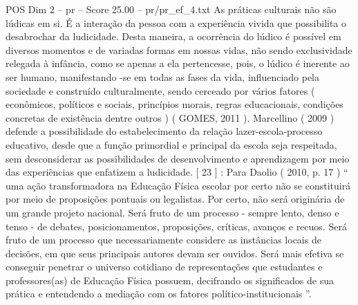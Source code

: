 \begin{textsample}{POS Dim 2 – pr – Score 25.00 – pr/pr\_ef\_4.txt}
As práticas culturais não são lúdicas em si.
É a interação da pessoa com a experiência vivida que possibilita o desabrochar da ludicidade.
Desta maneira, a ocorrência do lúdico é possível em diversos momentos e de variadas formas em nossas vidas, não sendo exclusividade relegada à infância, como se apenas a ela pertencesse, pois, o lúdico é inerente ao ser humano, manifestando -se em todas as fases da vida, influenciado pela sociedade e construído culturalmente, sendo cerceado por vários fatores ( econômicos, políticos e sociais, princípios morais, regras educacionais, condições concretas de existência dentre outros ) ( GOMES, 2011 ).
Marcellino ( 2009 ) defende a possibilidade do estabelecimento da relação lazer-escola-processo educativo, desde que a função primordial e principal da escola seja respeitada, sem desconsiderar as possibilidades de desenvolvimento e aprendizagem por meio das experiências que enfatizem a ludicidade. [ 23 ] : Para Daolio ( 2010, p. 17 ) “ uma ação transformadora na Educação Física escolar por certo não se constituirá por meio de proposições pontuais ou legalistas.
Por certo, não será originária de um grande projeto nacional.
Será fruto de um processo - sempre lento, denso e tenso - de debates, posicionamentos, proposições, críticas, avanços e recuos.
Será fruto de um processo que necessariamente considere as instâncias locais de decisões, em que seus principais autores devam ser ouvidos.
Será mais efetiva se conseguir penetrar o universo cotidiano de representações que estudantes e professores(as) de Educação Física possuem, decifrando os significados de sua prática e entendendo a mediação com os fatores político-institucionais ”.

\end{textsample}
